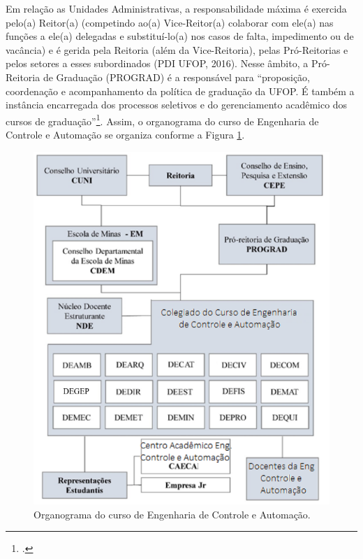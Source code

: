 \documentclass[
	12pt,				%
	openright,			%
	oneside,			%
	a4paper,			%
	english,			%
	brazil				%
	]{abntex2}
\begin{document}
Em relação as Unidades Administrativas, a responsabilidade máxima é exercida pelo(a) Reitor(a) (competindo ao(a) Vice-Reitor(a) colaborar com ele(a) nas funções a ele(a) delegadas e substituí-lo(a) nos casos de falta, impedimento ou de vacância) e é gerida pela Reitoria (além da Vice-Reitoria), pelas Pró-Reitorias e pelos setores a esses subordinados (PDI UFOP, 2016). Nesse âmbito, a Pró-Reitoria de Graduação (PROGRAD) é a responsável para ``proposição, coordenação e acompanhamento da política de graduação da UFOP. É também a instância encarregada dos processos seletivos e do gerenciamento acadêmico dos cursos de graduação''\footcite{PDI-UFOP}. Assim, o organograma do curso de Engenharia de Controle e Automação se organiza conforme a Figura \ref{fig:organograma}.

\begin{figure}[hbtp]
	\centering
	\includegraphics[scale=0.7]{estrutura-administrativa}
	\caption{Organograma do curso de Engenharia de Controle e Automação.}
	\label{fig:organograma}
\end{figure}
\end{document}
